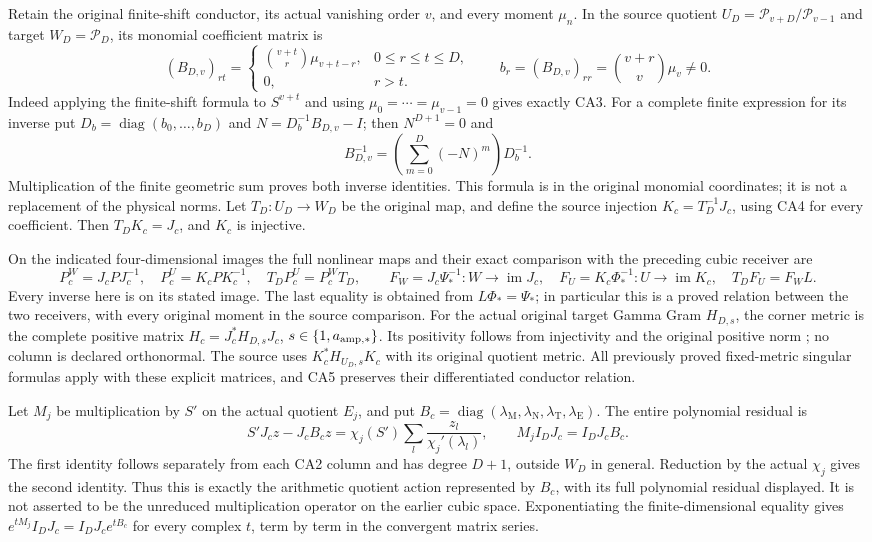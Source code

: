 Retain the original finite-shift conductor, its actual vanishing
order $v$, and every moment $\mu_n$. In the source quotient
$U_D=\mathcal P_{v+D}/\mathcal P_{v-1}$ and target
$W_D=\mathcal P_D$, its monomial coefficient matrix is
\[
 (B_{D,v})_{rt}=\begin{cases}
 \binom{v+t}{r}\mu_{v+t-r},&0\le r\le t\le D,\\
 0,&r>t.
 \end{cases}\qquad
 b_r=(B_{D,v})_{rr}=\binom{v+r}{v}\mu_v\ne0. \tag{CA3}
\]
Indeed applying the finite-shift formula to $S^{v+t}$ and
using $\mu_0=\cdots=\mu_{v-1}=0$ gives exactly CA3.
For a complete finite expression for its inverse put
$D_b=\operatorname{diag}(b_0,\ldots,b_D)$ and
$N=D_b^{-1}B_{D,v}-I$; then $N^{D+1}=0$ and
\[
 B_{D,v}^{-1}=\left(\sum_{m=0}^D(-N)^m\right)D_b^{-1}.
 \tag{CA4}
\]
Multiplication of the finite geometric sum proves both inverse
identities. This formula is in the original monomial coordinates;
it is not a replacement of the physical norms. Let $T_D:U_D\to W_D$
be the original map, and define the source injection
$K_c=T_D^{-1}J_c$, using CA4 for every coefficient. Then
$T_DK_c=J_c$, and $K_c$ is injective.

On the indicated four-dimensional images the full nonlinear maps
and their exact comparison with the preceding cubic receiver are
\[
 P_c^W=J_cPJ_c^{-1},\quad P_c^U=K_cPK_c^{-1},\quad
 T_DP_c^U=P_c^WT_D,\qquad
 F_W=J_c\Psi_*^{-1}:W\to\operatorname{im}J_c,\quad
 F_U=K_c\Phi_*^{-1}:U\to\operatorname{im}K_c,
 \quad T_DF_U=F_WL. \tag{CA5}
\]
Every inverse here is on its stated image. The last equality is
obtained from $L\Phi_*=\Psi_*$; in particular this is a proved
relation between the two receivers, with every original moment
in the source comparison.
For the actual original target Gamma Gram $H_{D,s}$, the corner
metric is the complete positive matrix
$H_c=J_c^*H_{D,s}J_c$, $s\in\{1,a_{\rm amp,*}\}$.
Its positivity follows from injectivity and the original positive
norm \cite{fullfable:WCF}; no column is declared orthonormal.
The source uses $K_c^*H_{U_D,s}K_c$ with its original quotient
metric. All previously proved fixed-metric singular formulas apply
with these explicit matrices, and CA5 preserves their differentiated
conductor relation.

Let $M_j$ be multiplication by $S'$ on the actual quotient $E_j$,
and put $B_c=\operatorname{diag}(\lambda_\mathrm M,
\lambda_\mathrm N,\lambda_\mathrm T,\lambda_\mathrm E)$.
The entire polynomial residual is
\[
 S'J_cz-J_cB_cz
 =\chi_j(S')\sum_l\frac{z_l}{\chi_j'(\lambda_l)},\qquad
 M_j I_DJ_c=I_DJ_c B_c. \tag{CA6}
\]
The first identity follows separately from each CA2 column and
has degree $D+1$, outside $W_D$ in general. Reduction by the
actual $\chi_j$ gives the second identity. Thus this is exactly
the arithmetic quotient action represented by $B_c$, with its
full polynomial residual displayed. It is not asserted to be the
unreduced multiplication operator on the earlier cubic space.
Exponentiating the finite-dimensional equality gives
$e^{tM_j}I_DJ_c=I_DJ_c e^{tB_c}$ for every complex $t$, term
by term in the convergent matrix series.

